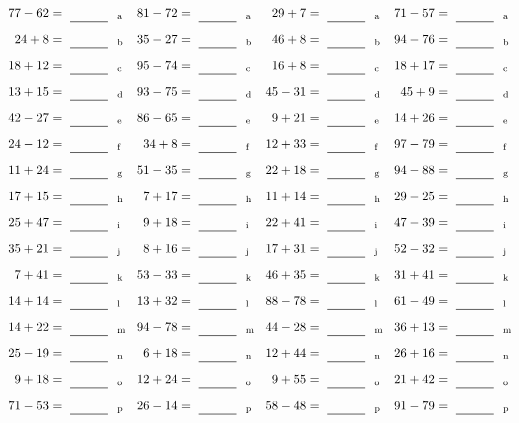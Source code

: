 \documentclass
[
  draft    = true,
  fontsize = 11pt,
  parskip  = half-
]
{scrartcl}
\begin{document}
\clearpage
\begin{align*}
    \pline{77-62}&=\rline{a}
  & \pline{81-72}&=\rline{a}
  & \pline{29+7}&=\rline{a}
  & \pline{71-57}&=\rline{a} \\[1ex]
    \pline{24+8}&=\rline{b}
  & \pline{35-27}&=\rline{b}
  & \pline{46+8}&=\rline{b}
  & \pline{94-76}&=\rline{b} \\[1ex]
    \pline{18+12}&=\rline{c}
  & \pline{95-74}&=\rline{c}
  & \pline{16+8}&=\rline{c}
  & \pline{18+17}&=\rline{c} \\[1ex]
    \pline{13+15}&=\rline{d}
  & \pline{93-75}&=\rline{d}
  & \pline{45-31}&=\rline{d}
  & \pline{45+9}&=\rline{d} \\[1ex]
    \pline{42-27}&=\rline{e}
  & \pline{86-65}&=\rline{e}
  & \pline{9+21}&=\rline{e}
  & \pline{14+26}&=\rline{e} \\[1ex]
    \pline{24-12}&=\rline{f}
  & \pline{34+8}&=\rline{f}
  & \pline{12+33}&=\rline{f}
  & \pline{97-79}&=\rline{f} \\[1ex]
    \pline{11+24}&=\rline{g}
  & \pline{51-35}&=\rline{g}
  & \pline{22+18}&=\rline{g}
  & \pline{94-88}&=\rline{g} \\[1ex]
    \pline{17+15}&=\rline{h}
  & \pline{7+17}&=\rline{h}
  & \pline{11+14}&=\rline{h}
  & \pline{29-25}&=\rline{h} \\[1ex]
    \pline{25+47}&=\rline{i}
  & \pline{9+18}&=\rline{i}
  & \pline{22+41}&=\rline{i}
  & \pline{47-39}&=\rline{i} \\[1ex]
    \pline{35+21}&=\rline{j}
  & \pline{8+16}&=\rline{j}
  & \pline{17+31}&=\rline{j}
  & \pline{52-32}&=\rline{j} \\[1ex]
    \pline{7+41}&=\rline{k}
  & \pline{53-33}&=\rline{k}
  & \pline{46+35}&=\rline{k}
  & \pline{31+41}&=\rline{k} \\[1ex]
    \pline{14+14}&=\rline{l}
  & \pline{13+32}&=\rline{l}
  & \pline{88-78}&=\rline{l}
  & \pline{61-49}&=\rline{l} \\[1ex]
    \pline{14+22}&=\rline{m}
  & \pline{94-78}&=\rline{m}
  & \pline{44-28}&=\rline{m}
  & \pline{36+13}&=\rline{m} \\[1ex]
    \pline{25-19}&=\rline{n}
  & \pline{6+18}&=\rline{n}
  & \pline{12+44}&=\rline{n}
  & \pline{26+16}&=\rline{n} \\[1ex]
    \pline{9+18}&=\rline{o}
  & \pline{12+24}&=\rline{o}
  & \pline{9+55}&=\rline{o}
  & \pline{21+42}&=\rline{o} \\[1ex]
    \pline{71-53}&=\rline{p}
  & \pline{26-14}&=\rline{p}
  & \pline{58-48}&=\rline{p}
  & \pline{91-79}&=\rline{p}
\end{align*}
\end{document}
